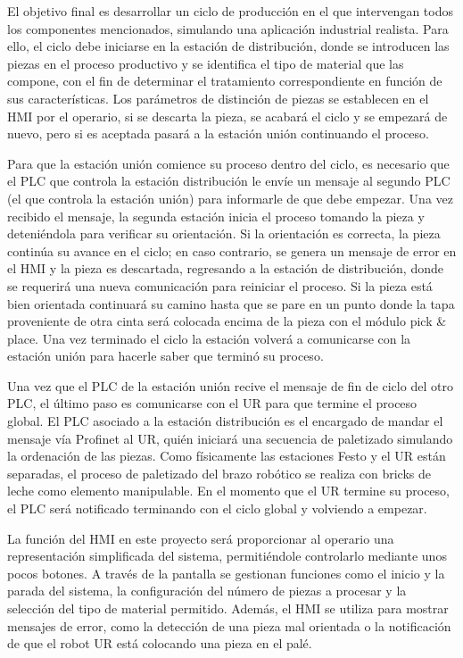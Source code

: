 El objetivo final es desarrollar un ciclo de producción en el que intervengan todos los componentes mencionados, simulando una aplicación industrial realista. Para ello, el ciclo debe iniciarse en la estación de distribución, donde se introducen las piezas en el proceso productivo y se identifica el tipo de material que las compone, con el fin de determinar el tratamiento correspondiente en función de sus características. Los parámetros de distinción de piezas se establecen en el HMI por el operario, si se descarta la pieza, se acabará el ciclo y se empezará de nuevo, pero si es aceptada pasará a la estación unión continuando el proceso. 

Para que la estación unión comience su proceso dentro del ciclo, es necesario que el PLC que controla la estación distribución le envíe un mensaje al segundo PLC (el que controla la estación unión) para informarle de que debe empezar.  Una vez recibido el mensaje, la segunda estación inicia el proceso tomando la pieza y deteniéndola para verificar su orientación. Si la orientación es correcta, la pieza continúa su avance en el ciclo; en caso contrario, se genera un mensaje de error en el HMI y la pieza es descartada, regresando a la estación de distribución, donde se requerirá una nueva comunicación para reiniciar el proceso. Si la pieza está bien orientada continuará su camino hasta que se pare en un punto donde la tapa proveniente de otra cinta será colocada encima de la pieza con el módulo pick \& place. Una vez terminado el ciclo la estación volverá a comunicarse con la estación unión para hacerle saber que terminó su proceso.

Una vez que el PLC de la estación unión recive el mensaje de fin de ciclo del otro PLC, el último paso es comunicarse con el UR para que termine el proceso global. El PLC asociado a la estación distribución es el encargado de mandar el mensaje vía Profinet al UR, quién iniciará una secuencia de paletizado simulando la ordenación de las piezas. Como físicamente las estaciones Festo y el UR están separadas, el proceso de paletizado del brazo robótico se realiza con bricks de leche como elemento manipulable. En el momento que el UR termine su proceso, el PLC será notificado terminando con el ciclo global y volviendo a empezar.

La función del HMI en este proyecto será proporcionar al operario una representación simplificada del sistema, permitiéndole controlarlo mediante unos pocos botones. A través de la pantalla se gestionan funciones como el inicio y la parada del sistema, la configuración del número de piezas a procesar y la selección del tipo de material permitido. Además, el HMI se utiliza para mostrar mensajes de error, como la detección de una pieza mal orientada o la notificación de que el robot UR está colocando una pieza en el palé.

